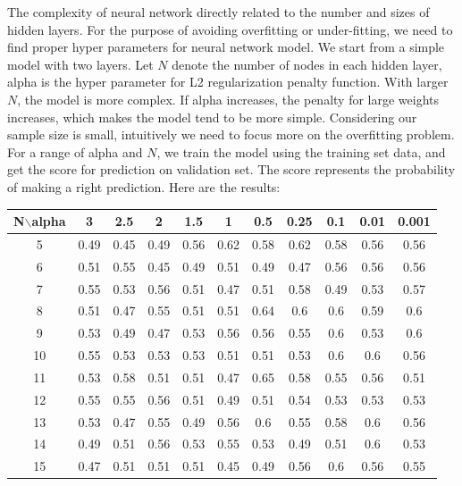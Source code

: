 \documentclass{article}
\begin{document}
The complexity of neural network directly related to the number and sizes of hidden layers. For the purpose of avoiding overfitting or under-fitting, we need to find proper hyper parameters for neural network model. We start from a simple model with two layers. Let $N$ denote the number of nodes in each hidden layer, alpha is the hyper parameter for L2 regularization penalty function. With larger $N$, the model is more complex. If alpha increases, the penalty for large weights increases, which makes the model tend to be more simple. Considering our sample size is small, intuitively we need to focus more on the overfitting problem. For a range of alpha and $N$, we train the model using the training set data, and get the score for prediction on validation set. The score represents the probability of making a right prediction. Here are the results:
    \begin{center}
    \begin{tabular}{|c|c|c|c|c|c|c|c|c|c|c|}
   \hline
        N$\backslash$alpha & 3 & 2.5 & 2 & 1.5 & 1 & 0.5 & 0.25 & 0.1 & 0.01 & 0.001  \\ \hline
        5 & 0.49 & 0.45 & 0.49 & 0.56 & 0.62 & 0.58 & 0.62 & 0.58 & 0.56 & 0.56  \\ \hline
        6 & 0.51 & 0.55 & 0.45 & 0.49 & 0.51 & 0.49 & 0.47 & 0.56 & 0.56 & 0.56  \\ \hline
        7 & 0.55 & 0.53 & 0.56 & 0.51 & 0.47 & 0.51 & 0.58 & 0.49 & 0.53 & 0.57  \\ \hline
        8 & 0.51 & 0.47 & 0.55 & 0.51 & 0.51 & 0.64 & 0.6 & 0.6 & 0.59 & 0.6  \\ \hline
        9 & 0.53 & 0.49 & 0.47 & 0.53 & 0.56 & 0.56 & 0.55 & 0.6 & 0.53 & 0.6  \\ \hline
        10 & 0.55 & 0.53 & 0.53 & 0.53 & 0.51 & 0.51 & 0.53 & 0.6 & 0.6 & 0.56  \\ \hline
        11 & 0.53 & 0.58 & 0.51 & 0.51 & 0.47 & 0.65 & 0.58 & 0.55 & 0.56 & 0.51  \\ \hline
        12 & 0.55 & 0.55 & 0.56 & 0.51 & 0.49 & 0.51 & 0.54 & 0.53 & 0.53 & 0.53  \\ \hline
        13 & 0.53 & 0.47 & 0.55 & 0.49 & 0.56 & 0.6 & 0.55 & 0.58 & 0.6 & 0.56  \\ \hline
        14 & 0.49 & 0.51 & 0.56 & 0.53 & 0.55 & 0.53 & 0.49 & 0.51 & 0.6 & 0.53  \\ \hline
        15 & 0.47 & 0.51 & 0.51 & 0.51 & 0.45 & 0.49 & 0.56 & 0.6 & 0.56 & 0.55 \\ \hline
    \end{tabular}
\end{center}
\end{document}
